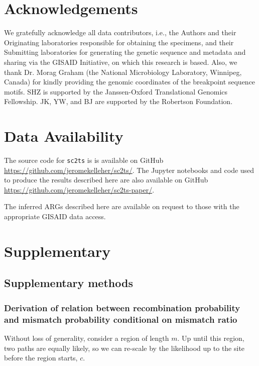 \documentclass{article}
\begin{document}
\section{Acknowledgements}
We gratefully acknowledge all data contributors, i.e., the Authors and their
Originating laboratories responsible for obtaining the specimens, and their
Submitting laboratories for generating the genetic sequence and metadata and
sharing via the GISAID Initiative, on which this research is based. Also, we
thank Dr. Morag Graham (the National Microbiology Laboratory, Winnipeg, Canada)
for kindly providing the genomic coordinates of the breakpoint sequence motifs.
SHZ is supported by the Janssen-Oxford Translational Genomics Fellowship. JK,
YW, and BJ are supported by the Robertson Foundation.

\section{Data Availability}
The source code for \texttt{sc2ts} is
is available on GitHub
\url{https://github.com/jeromekelleher/sc2ts/}.
The Jupyter notebooks and code used to produce the results described here are also
available on GitHub \url{https://github.com/jeromekelleher/sc2ts-paper/}.

The inferred ARGs described here are available on request to those with
the appropriate GISAID data access.




\renewcommand\thefigure{S\arabic{figure}}
\setcounter{figure}{0}
\renewcommand\thetable{S\arabic{table}}
\setcounter{table}{0}
\section*{Supplementary}
\subsection*{Supplementary methods}
\subsubsection*{Derivation of relation between recombination probability and mismatch probability conditional on mismatch ratio}
Without loss of generality, consider a region of length $m$. Up until this region, two paths are equally likely, so we can re-scale by the likelihood up to the site before the region starts, $c$.
\end{document}
